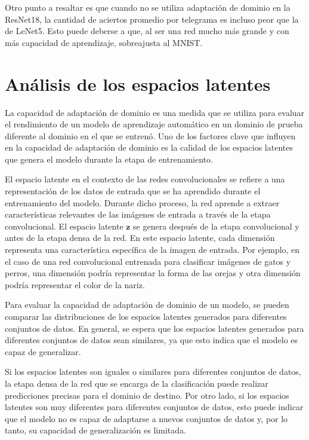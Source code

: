 Otro punto a resaltar es que cuando no se utiliza adaptación de dominio en la ResNet18, la cantidad de aciertos
promedio por telegrama es incluso peor que la de LeNet5. Esto puede deberse a que, al ser una red mucho más grande y
con más capacidad de aprendizaje, sobreajusta al MNIST.

\section{Análisis de los espacios latentes}

La capacidad de adaptación de dominio es una medida que se utiliza para evaluar el rendimiento de un modelo de
aprendizaje automático en un dominio de prueba diferente al dominio en el que se entrenó. Uno de los factores clave que
influyen en la capacidad de adaptación de dominio es la calidad de los espacios latentes que genera el modelo durante
la etapa de entrenamiento.

El espacio latente en el contexto de las redes convolucionales se refiere a una representación de los datos de entrada
que se ha aprendido durante el entrenamiento del modelo. Durante dicho proceso, la red aprende a extraer
características relevantes de las imágenes de entrada a través de la etapa convolucional. El espacio latente
$\mathbf{z}$ se genera después de la etapa convolucional y antes de la etapa densa de la red. En este espacio latente,
cada dimensión representa una característica específica de la imagen de entrada. Por ejemplo, en el caso de una red
convolucional entrenada para clasificar imágenes de gatos y perros, una dimensión podría representar la forma de las
orejas y otra dimensión podría representar el color de la nariz.

Para evaluar la capacidad de adaptación de dominio de un modelo, se pueden comparar las distribuciones de los espacios
latentes generados para diferentes conjuntos de datos. En general, se espera que los espacios latentes generados para
diferentes conjuntos de datos sean similares, ya que esto indica que el modelo es capaz de generalizar.

Si los espacios latentes son iguales o similares para diferentes conjuntos de datos, la etapa densa de la red que se
encarga de la clasificación puede realizar predicciones precisas para el dominio de destino. Por otro lado, si los
espacios latentes son muy diferentes para diferentes conjuntos de datos, esto puede indicar que el modelo no es capaz
de adaptarse a nuevos conjuntos de datos y, por lo tanto, su capacidad de generalización es limitada.

